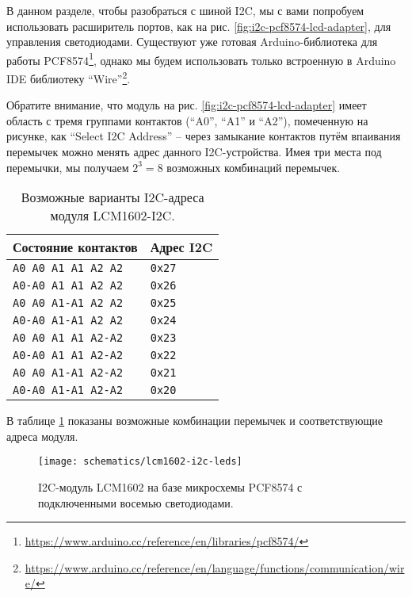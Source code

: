 \documentclass[../sparc.tex]{subfiles}
\begin{document}
В данном разделе, чтобы разобраться с шиной I2C, мы с вами попробуем
использовать расширитель портов, как на рис. \ref{fig:i2c-pcf8574-lcd-adapter},
для управления светодиодами.  Существуют уже готовая Arduino-библиотека для
работы
PCF8574\footnote{\url{https://www.arduino.cc/reference/en/libraries/pcf8574/}},
однако мы будем использовать только встроенную в Arduino IDE библиотеку
``Wire''\footnote{\url{https://www.arduino.cc/reference/en/language/functions/communication/wire/}}.

Обратите внимание, что модуль на рис. \ref{fig:i2c-pcf8574-lcd-adapter} имеет
область с тремя группами контактов (``A0'', ``A1'' и ``A2''), помеченную на
рисунке, как ``Select I2C Address'' -- через замыкание контактов путём впаивания
перемычек можно менять адрес данного I2C-устройства.  Имея три места под
перемычки, мы получаем $2^3 = 8$ возможных комбинаций перемычек.

\begin{table}[H]
  \centering
  \begin{tabular}{ | m{12em} | m{2cm} | }
    \hline
    \textbf{Состояние контактов} & \textbf{Адрес I2C} \\
    \hline
    \texttt{A0 A0 A1 A1 A2 A2} & \texttt{0x27} \\
    \hline
    \texttt{A0-A0 A1 A1 A2 A2} & \texttt{0x26} \\
    \hline
    \texttt{A0 A0 A1-A1 A2 A2} & \texttt{0x25} \\
    \hline
    \texttt{A0-A0 A1-A1 A2 A2} & \texttt{0x24} \\
    \hline
    \texttt{A0 A0 A1 A1 A2-A2} & \texttt{0x23} \\
    \hline
    \texttt{A0-A0 A1 A1 A2-A2} & \texttt{0x22} \\
    \hline
    \texttt{A0 A0 A1-A1 A2-A2} & \texttt{0x21} \\
    \hline
    \texttt{A0-A0 A1-A1 A2-A2} & \texttt{0x20} \\
    \hline
  \end{tabular}
  \caption{Возможные варианты I2C-адреса модуля LCM1602-I2C.}
  \label{table:i2c-lcm1602-addressing}
\end{table}

В таблице \ref{table:i2c-lcm1602-addressing} показаны возможные комбинации
перемычек и соответствующие адреса модуля.

\begin{figure}[H]
  \centering
  \texttt{[image: schematics/lcm1602-i2c-leds]}
  \caption{I2C-модуль LCM1602 на базе микросхемы PCF8574 с подключенными восемью
    светодиодами.}
  \label{fig:lcm1602-i2c-leds}
\end{figure}
\end{document}
